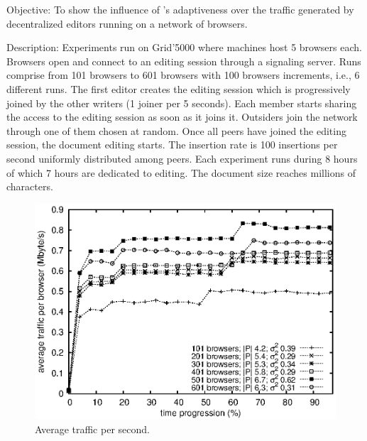 \begin{asparadesc}
\item [Objective:] To show the influence of \SPRAY's adaptiveness over the
  traffic generated by decentralized editors running on a network of browsers.
\item [Description:] Experiments run on Grid'5000 where machines host 5 browsers
  each. Browsers open \CRATE and connect to an editing session through a
  signaling server.  Runs comprise from 101 browsers to 601 browsers with 100
  browsers increments, i.e., 6 different runs.  The first editor creates the
  editing session which is progressively joined by the other writers (1 joiner
  per 5 seconds). Each member starts sharing the access to the editing session
  as soon as it joins it. Outsiders join the network through one of them chosen
  at random. Once all peers have joined the editing session, the document
  editing starts. The insertion rate is 100 insertions per second uniformly
  distributed among peers. Each experiment runs during 8 hours of which 7 hours
  are dedicated to editing. The document size reaches millions of characters.

\begin{figure}
  \centering
  \includegraphics[width=\SCALE\textwidth]{img/traffic.eps}
  \caption{\label{fig:traffic}Average traffic per second.}
\end{figure}


\end{asparadesc}
